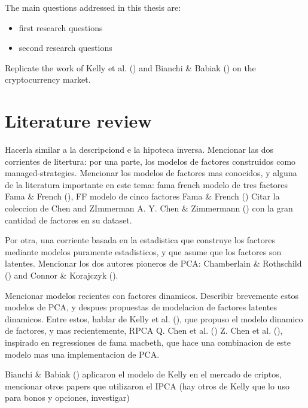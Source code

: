 \documentclass[
  12pt,
  a4paper,
  openany]{scrbook}
\providecommand{\tightlist}{%
  \setlength{\itemsep}{0pt}\setlength{\parskip}{0pt}}
\begin{document}
The main questions addressed in this thesis are:

\begin{itemize}
\tightlist
\item
  first research questions
\item
  second research questions
\end{itemize}

Replicate the work of Kelly et al.
() and Bianchi \& Babiak
() on the
cryptocurrency market.

\section{Literature review}\label{literature-review}

Hacerla similar a la descripciond e la hipoteca inversa. Mencionar las
dos corrientes de litertura: por una parte, los modelos de factores
construidos como managed-strategies. Mencionar los modelos de factores
mas conocidos, y alguna de la literatura importante en este tema: fama
french modelo de tres factores Fama \& French
(), FF modelo de cinco factores
Fama \& French () Citar la
coleccion de Chen and ZImmerman A. Y. Chen \& Zimmermann
() con la gran cantidad de
factores en su dataset.

Por otra, una corriente basada en la estadistica que construye los
factores mediante modelos puramente estadisticos, y que asume que los
factores son latentes. Mencionar los dos autores pioneros de PCA:
Chamberlain \& Rothschild
() and Connor \&
Korajczyk ().

Mencionar modelos recientes con factores dinamicos. Describir brevemente
estos modelos de PCA, y despues propuestas de modelacion de factores
latentes dinamicos. Entre estos, hablar de Kelly et al.
(), que propuso el
modelo dinamico de factores, y mas recientemente, RPCA Q. Chen et al.
() Z. Chen et al.
(), inspirado en regressiones de
fama macbeth, que hace una combinacion de este modelo mas una
implementacion de PCA.

Bianchi \& Babiak
() aplicaron
el modelo de Kelly en el mercado de criptos, mencionar otros papers que
utilizaron el IPCA (hay otros de Kelly que lo uso para bonos y opciones,
investigar)
\end{document}
